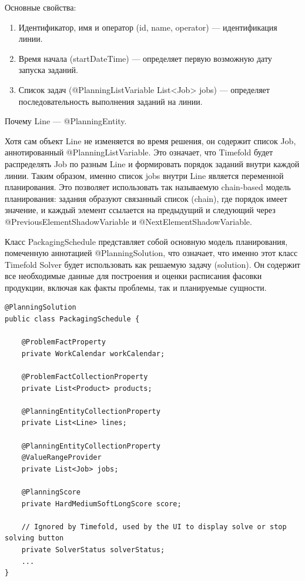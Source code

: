 Основные свойства:

\begin{enumerate}
    \item Идентификатор, имя и оператор (id, name, operator) — идентификация линии.
    \item Время начала (startDateTime) — определяет первую возможную дату запуска заданий.
    \item Список задач (@PlanningListVariable List<Job> jobs) — определяет последовательность выполнения заданий на линии.
\end{enumerate}

Почему Line — @PlanningEntity.

Хотя сам объект Line не изменяется во время решения, он содержит список Job, аннотированный @PlanningListVariable. Это означает, что Timefold будет распределять Job по разным Line и формировать порядок заданий внутри каждой линии. Таким образом, именно список jobs внутри Line является переменной планирования. Это позволяет использовать так называемую chain-based модель планирования: задания образуют связанный список (chain), где порядок имеет значение, и каждый элемент ссылается на предыдущий и следующий через @PreviousElementShadowVariable и @NextElementShadowVariable. \

Класс PackagingSchedule представляет собой основную модель планирования, помеченную аннотацией @PlanningSolution, что означает, что именно этот класс Timefold Solver будет использовать как решаемую задачу (solution). Он содержит все необходимые данные для построения и оценки расписания фасовки продукции, включая как факты проблемы, так и планируемые сущности.

\begin{lstlisting}[caption={класс PackagingSchedule}, label={lst:classPackagingShedule}]
@PlanningSolution
public class PackagingSchedule {

    @ProblemFactProperty
    private WorkCalendar workCalendar;

    @ProblemFactCollectionProperty
    private List<Product> products;

    @PlanningEntityCollectionProperty
    private List<Line> lines;

    @PlanningEntityCollectionProperty
    @ValueRangeProvider
    private List<Job> jobs;

    @PlanningScore
    private HardMediumSoftLongScore score;

    // Ignored by Timefold, used by the UI to display solve or stop solving button
    private SolverStatus solverStatus;
    ...
}
\end{lstlisting}


